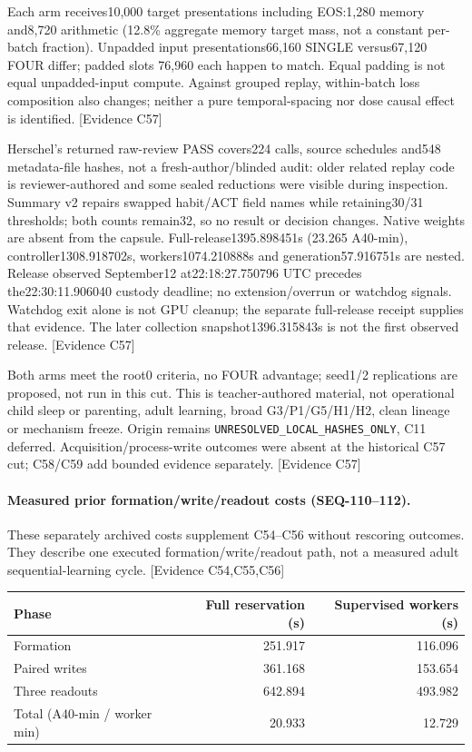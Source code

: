 \documentclass[11pt]{article}
\newcommand{\ev}[1]{\textsf{[Evidence #1]}}
\begin{document}
Each arm receives10,000 target presentations including EOS:1,280 memory and8,720
arithmetic (12.8\% aggregate memory target mass, not a constant per-batch fraction).
Unpadded input presentations66,160 SINGLE versus67,120 FOUR differ; padded slots
76,960 each happen to match. Equal padding is not equal unpadded-input compute.
Against grouped replay, within-batch loss composition also changes; neither a
pure temporal-spacing nor dose causal effect is identified. \ev{C57}

Herschel's returned raw-review PASS covers224 calls, source schedules and548
metadata-file hashes, not a fresh-author/blinded audit: older related replay code
is reviewer-authored and some sealed reductions were visible during inspection.
Summary v2 repairs swapped habit/ACT field names while retaining30/31 thresholds;
both counts remain32, so no result or decision changes. Native weights are absent
from the capsule. Full-release1395.898451s (23.265 A40-min), controller1308.918702s,
workers1074.210888s and generation57.916751s are nested. Release observed
September12 at22:18:27.750796 UTC precedes the22:30:11.906040 custody deadline;
no extension/overrun or watchdog signals. Watchdog exit alone is not GPU cleanup;
the separate full-release receipt supplies that evidence. The later collection
snapshot1396.315843s is not the first observed release. \ev{C57}

Both arms meet the root0 criteria, no FOUR advantage; seed1/2 replications are
proposed, not run in this cut. This is teacher-authored material, not operational
child sleep or parenting, adult learning, broad G3/P1/G5/H1/H2, clean lineage or
mechanism freeze. Origin remains \texttt{UNRESOLVED\_LOCAL\_HASHES\_ONLY}, C11
deferred. Acquisition/process-write outcomes were absent at the historical C57
cut; C58/C59 add bounded evidence separately. \ev{C57}

\paragraph{Measured prior formation/write/readout costs (SEQ-110--112).}
These separately archived costs supplement C54--C56 without rescoring outcomes.
They describe one executed formation/write/readout path, not a measured adult
sequential-learning cycle. \ev{C54,C55,C56}

\begin{center}
\begin{tabular}{lrr}
\toprule
Phase & Full reservation (s) & Supervised workers (s) \\
\midrule
Formation & 251.917 & 116.096 \\
Paired writes & 361.168 & 153.654 \\
Three readouts & 642.894 & 493.982 \\
Total (A40-min / worker min) & 20.933 & 12.729 \\
\bottomrule
\end{tabular}
\end{center}
\end{document}
